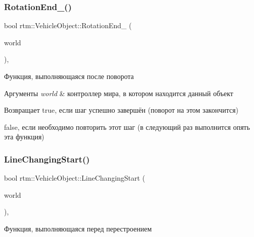 \subsubsection{\texorpdfstring{Rotation\+End\+\_\+()}{RotationEnd\_()}}
{\footnotesize\ttfamily bool rtm\+::\+Vehicle\+Object\+::\+Rotation\+End\+\_\+ (\begin{DoxyParamCaption}\item[{\hyperlink{classrtm_1_1_world_controller}{World\+Controller} $\ast$const}]{world }\end{DoxyParamCaption})\hspace{0.3cm}{\ttfamily [protected]}, {\ttfamily [virtual]}}



Функция, выполняющаяся после поворота 


\begin{DoxyParams}{Аргументы}
{\em world} & контроллер мира, в котором находится данный объект \\
\hline
\end{DoxyParams}
\begin{DoxyReturn}{Возвращает}
true, если шаг успешно завершён (поворот на этом закончится) 

false, если необходимо повторить этот шаг (в следующий раз выполнится опять эта функция) 
\end{DoxyReturn}
\mbox{\label{classrtm_1_1_vehicle_object_a8976be533dfa4704f7b221c79d1fce99}} 
\subsubsection{\texorpdfstring{Line\+Changing\+Start()}{LineChangingStart()}}
{\footnotesize\ttfamily bool rtm\+::\+Vehicle\+Object\+::\+Line\+Changing\+Start (\begin{DoxyParamCaption}\item[{\hyperlink{classrtm_1_1_world_controller}{World\+Controller} $\ast$const}]{world }\end{DoxyParamCaption})\hspace{0.3cm}{\ttfamily [protected]}, {\ttfamily [virtual]}}



Функция, выполняющаяся перед перестроением 


